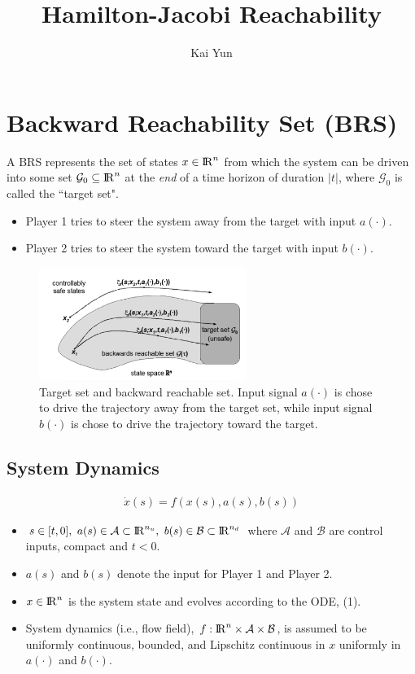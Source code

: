 \documentclass{article}
\title{Hamilton-Jacobi Reachability}
\author{Kai Yun}
\begin{document}
\maketitle

\section{Backward Reachability Set (BRS)}

\quad A BRS represents the set of states $x \in {\rm I\!R}^n$ from which the system can be driven into some set $\mathcal{G}_{0} \subseteq {\rm I\!R}^n$ at the \textit{end} of a time horizon of duration $|t|$, where $\mathcal{G}_{0}$ is called the ``target set". \\
\begin{itemize}
    \item Player 1 tries to steer the system away from the target with input $a(\cdot).$
    \item Player 2 tries to steer the system toward the target with input $b(\cdot).$
\end{itemize}

\begin{figure}[h]
\centering
\includegraphics[width=0.6\textwidth]{BRS.PNG}
\caption{Target set and backward reachable set. Input signal $a(\cdot)$ is chose to drive the trajectory away from the target set, while input signal $b(\cdot)$ is chose to drive the trajectory toward the target.}
\end{figure}

\subsection{System Dynamics}
\begin{align}
\dot{x}(s) = f(x(s), a(s), b(s))
\end{align}

\begin{itemize}
    \item $s\in[t,0],\ a(s) \in \mathcal{A} \subset {\rm I\!R}^{n_u},\ b(s) \in \mathcal{B} \subset {\rm I\!R}^{n_d}$ where $\mathcal{A}$ and $\mathcal{B}$ are control inputs, compact and $t < 0$.
    \item $a(s)$ and $b(s)$ denote the input for Player 1 and Player 2.
    \item $x \in  {\rm I\!R}^n$ is the system state and evolves according to the ODE, (1).
    \item System dynamics (i.e., flow field), $f: {\rm I\!R}^n \times \mathcal{A} \times \mathcal{B}$, is assumed to be uniformly continuous, bounded, and Lipschitz continuous in $x$ uniformly in $a(\cdot)$ and $b(\cdot)$.
\end{itemize}
\end{document}
